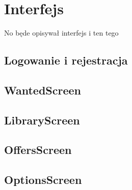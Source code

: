 \chapter{Interfejs}
\label{cha:interfejs}

No będe opisywał interfejs i ten tego

\section{Logowanie i rejestracja}


\section{WantedScreen}


\section{LibraryScreen}


\section{OffersScreen}


\section{OptionsScreen}



